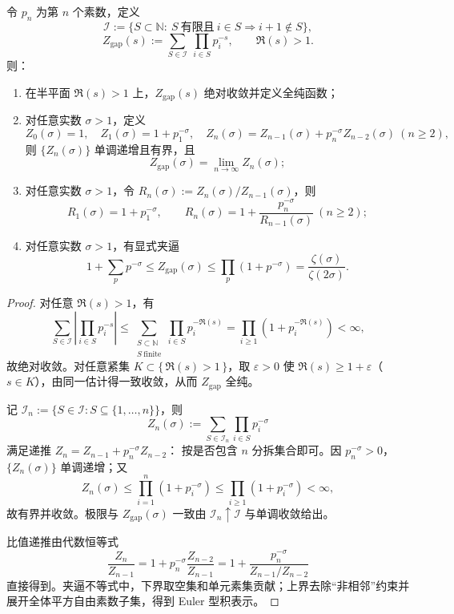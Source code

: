 \begin{theorem}\label{thm:group-jg-gap-dirichlet-continued-fraction}
令 \(p_n\) 为第 \(n\) 个素数，定义
\[
\mathcal I:=\{S\subset\mathbb N:\ S\ \text{有限且}\ i\in S\Rightarrow i+1\notin S\},
\]
\[
Z_{\mathrm{gap}}(s):=\sum_{S\in\mathcal I}\ \prod_{i\in S} p_i^{-s},
\qquad \Re(s)>1.
\]
则：
\begin{enumerate}
  \item 在半平面 \(\Re(s)>1\) 上，\(Z_{\mathrm{gap}}(s)\) 绝对收敛并定义全纯函数；
  \item 对任意实数 \(\sigma>1\)，定义
  \[
  Z_0(\sigma)=1,\quad
  Z_1(\sigma)=1+p_1^{-\sigma},\quad
  Z_n(\sigma)=Z_{n-1}(\sigma)+p_n^{-\sigma}Z_{n-2}(\sigma)\ (n\ge 2),
  \]
  则 \(\{Z_n(\sigma)\}\) 单调递增且有界，且
  \[
  Z_{\mathrm{gap}}(\sigma)=\lim_{n\to\infty}Z_n(\sigma);
  \]
  \item 对任意实数 \(\sigma>1\)，令
  \(
  R_n(\sigma):=Z_n(\sigma)/Z_{n-1}(\sigma)
  \)，则
  \[
  R_1(\sigma)=1+p_1^{-\sigma},\qquad
  R_n(\sigma)=1+\frac{p_n^{-\sigma}}{R_{n-1}(\sigma)}\ (n\ge 2);
  \]
  \item 对任意实数 \(\sigma>1\)，有显式夹逼
  \[
  1+\sum_{p}p^{-\sigma}
  \le
  Z_{\mathrm{gap}}(\sigma)
  \le
  \prod_{p}(1+p^{-\sigma})
  =
  \frac{\zeta(\sigma)}{\zeta(2\sigma)}.
  \]
\end{enumerate}
\end{theorem}
\begin{proof}
对任意 \(\Re(s)>1\)，有
\[
\sum_{S\in\mathcal I}\left|\prod_{i\in S}p_i^{-s}\right|
\le
\sum_{\substack{S\subset\mathbb N\\ S\ \mathrm{finite}}}\prod_{i\in S}p_i^{-\Re(s)}
=
\prod_{i\ge 1}(1+p_i^{-\Re(s)})<\infty,
\]
故绝对收敛。对任意紧集 \(K\subset\{\,\Re(s)>1\,\}\)，取 \(\varepsilon>0\) 使 \(\Re(s)\ge 1+\varepsilon\)（\(s\in K\)），由同一估计得一致收敛，从而 \(Z_{\mathrm{gap}}\) 全纯。

记
\(
\mathcal I_n:=\{S\in\mathcal I:S\subseteq\{1,\dots,n\}\}
\)，则
\[
Z_n(\sigma):=\sum_{S\in\mathcal I_n}\prod_{i\in S}p_i^{-\sigma}
\]
满足递推
\(
Z_n=Z_{n-1}+p_n^{-\sigma}Z_{n-2}
\)：
按是否包含 \(n\) 分拆集合即可。因 \(p_n^{-\sigma}>0\)，\(\{Z_n(\sigma)\}\) 单调递增；又
\[
Z_n(\sigma)\le \prod_{i=1}^{n}(1+p_i^{-\sigma})\le \prod_{i\ge1}(1+p_i^{-\sigma})<\infty,
\]
故有界并收敛。极限与 \(Z_{\mathrm{gap}}(\sigma)\) 一致由 \(\mathcal I_n\uparrow\mathcal I\) 与单调收敛给出。

比值递推由代数恒等式
\[
\frac{Z_n}{Z_{n-1}}
=1+p_n^{-\sigma}\frac{Z_{n-2}}{Z_{n-1}}
=1+\frac{p_n^{-\sigma}}{Z_{n-1}/Z_{n-2}}
\]
直接得到。夹逼不等式中，下界取空集和单元素集贡献；上界去除“非相邻”约束并展开全体平方自由素数子集，得到 Euler 型积表示。
\end{proof}

